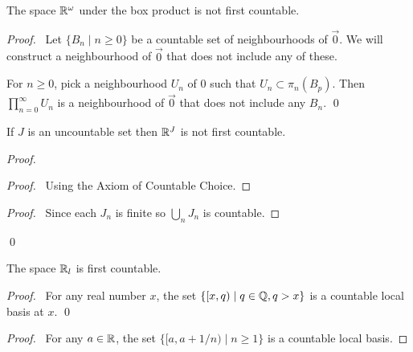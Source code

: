 \begin{example}[CC]
    The space $\mathbb{R}^\omega$ under the box product is not first countable.
\end{example}

\begin{proof}
    \pf\ Let $\{ B_n \mid n \geq 0 \}$ be a countable set of neighbourhoods of $\vec{0}$. We will construct a neighbourhood of $\vec{0}$ that does not include any of these.

    For $n \geq 0$, pick a neighbourhood $U_n$ of 0 such that $U_n \subset \pi_n(B_p)$. Then $\prod_{n=0}^\infty U_n$ is a neighbourhood of $\vec{0}$ that does not
    include any $B_n$. \qed
\end{proof}

\begin{example}
    If $J$ is an uncountable set then $\mathbb{R}^J$ is not first countable.
\end{example}

\begin{proof}
    \pf
    \begin{proof}
        \pf\ Using the Axiom of Countable Choice.
    \end{proof}
    \begin{proof}
        \pf\ Since each $J_n$ is finite so $\bigcup_n J_n$ is countable.
    \end{proof}
    \qed
\end{proof}

\begin{example}
    The space $\mathbb{R}_l$ is first countable.

    \begin{proof}
        \pf\ For any real number $x$, the set $\{ [x,q) \mid q \in \mathbb{Q}, q > x \}$
        is a countable local basis at $x$. \qed
    \end{proof}
\end{example}

\begin{proof}
    \pf\ For any $a \in \mathbb{R}$, the set $\{ [a,a + 1/n) \mid n \geq 1 \}$ is a countable local basis.
\end{proof}

